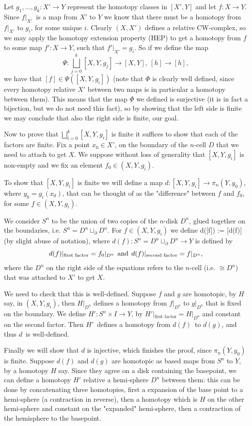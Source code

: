 \documentclass[a4paper,11pt,english]{article}
\begin{document}
\begin{exercise}[1]
Let $g_1,\dots, g_k: X' \to Y$ represent the homotopy classes in $[X',Y]$ and let $f: X \to Y$. 
Since $f|_{X'}$ is a map from $X'$ to $Y$ we know that there must be a homotopy from $f|_{X'}$
to $g_i$, for some unique $i$. Clearly $(X,X')$ defines a relative CW-complex, so we may apply the 
homotopy extension property (HEP) to get a homotopy from $f$ to some map $f': X\to Y$, 
such that $f'|_{X'} = g_i$. So if we define the map
\[ \Psi : \bigsqcup_{j=0}^k [X,Y,g_j] \to [X,Y],\ [h] \to [h], \]
we have that $[f] \in \Psi([X,Y,g_i])$ (note that $\Phi$ is clearly well defined, since every homotopy relative $X'$ between two maps is in particular a homotopy between them). This means that the map $\Phi$ we defined is surjective (it is in fact a bijection, but we do not need this fact), so by showing that 
the left side is finite we may conclude that also the right side is finite, our goal.

Now to prove that $\bigsqcup_{i=0}^k [X,Y,g_i]$ is finite it suffices to show that each of the factors are finite. Fix a point $x_0 \in X'$, on the boundary of the $n$-cell $D$ that we need to attach to get $X$. We suppose without loss of generality that $[X,Y,g_i]$ is non-empty and we fix an element $f_0 \in (X,Y,g_i)$.

To show that $[X,Y,g_i]$ is finite we will define a map $d: [X,Y,g_i] \to \pi_n(Y,y_0)$, where $y_0 = g_i(x_0)$, that 
can be thought of as the "difference" between $f$ and $f_0$, for some $f\in(X,Y,g_i)$.

We consider $S^n$ to be the union of two copies of the $n$-disk $D^n$, glued together on the boundaries, i.e. 
$S^n = D^n \sqcup_\partial D^n$. For $f \in (X,Y,g_i)$ we define d([f]) := [d(f)] (by slight abuse of notation),
where $d(f): S^n = D^n \sqcup_\partial D^n \to Y$ is defined by
\[ d(f)|_{\text{first factor}} = f_0|_{D^n} \:\:\text{and}\:\: d(f)|_{\text{second factor}} = f|_{D^n}, \]
where the $D^n$ on the right side of the equations refers to the $n$-cell (i.e. $\cong D^n$) that was attached to $X'$ to get $X$.

We need to check that this is well-defined. Suppose $f$ and $g$ are homotopic, by $H$ say, in $(X,Y,g_i)$, then $H|_{D^n}$ defines a homotopy from $f|_{D^n}$ to $g|_{D^n}$
that is fixed on the boundary. We define $H': S^n\times I \to Y$, by $H'|_{\text{first factor}} = H|_{D^n}$ and constant on the second 
factor. Then $H'$ defines a homotopy from $d(f)$ to $d(g)$, and thus $d$ is well-defined.

Finally we will show that $d$ is injective, which finishes the proof, since $\pi_n(Y,y_0)$ is finite. Suppose $d(f)$ and $d(g)$ are homotopic as based maps from $S^n$ to $Y$, by a homotopy $H$ say. 
Since they agree on a disk containing the basepoint, we can define a homotopy $H'$ relative a hemi-sphere $D^n$ between them: this can be done by concatenating three homotopies, first a expansion of the base point to a hemi-sphere (a contraction in reverse), then a homotopy which is $H$ on the other hemi-sphere and constant on the "expanded" hemi-sphere, then a contraction of the hemisphere to the basepoint.


\end{exercise}
\end{document}
